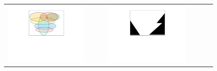   \begin{figure}[htb]
 \begin{tabular}{ccccc}
\begin{minipage}{0.25\textwidth}
 \includegraphics[width=\linewidth, trim=250  320 260 60,clip]{diagrams/Suff.pdf}
\end{minipage}
 & \ \ \ & 
\begin{minipage}{0.25\textwidth}
 \includegraphics[width=\linewidth, trim=250  320 260 60,clip]{diagrams/Nec.pdf}
\end{minipage}
 & \ \ \ &
\begin{minipage}{0.25\textwidth}

\end{minipage}
\end{tabular}
\end{figure}

